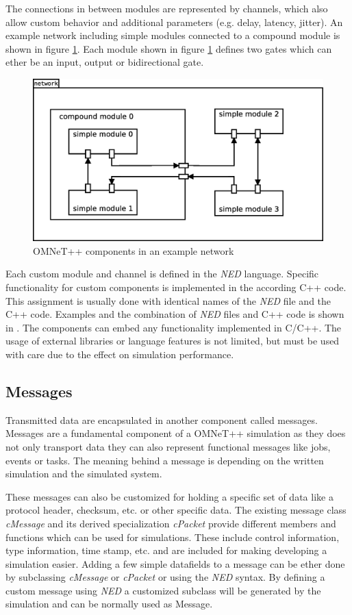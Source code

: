 \documentclass[journal]{IEEEtran}
\begin{document}
The connections in between modules are represented by channels, which also allow custom behavior and additional parameters (e.g. delay, latency, jitter).
An example network including simple modules connected to a compound module is shown in figure \ref{fig:OMNeTComponents}.
Each module shown in figure \ref{fig:OMNeTComponents} defines two gates which can ether be an input, output or bidirectional gate.

\begin{figure}
    \centering
    \includegraphics[width=0.9\columnwidth]{OMNeTComponents.eps}
    \caption{OMNeT++ components in an example network}
    \label{fig:OMNeTComponents}
\end{figure}

Each custom module and channel is defined in the \emph{NED} language.
Specific functionality for custom components is implemented in the according C++ code.
This assignment is usually done with identical names of the \emph{NED} file and the C++ code.
Examples and the combination of \emph{NED} files and C++ code is shown in \cite[chapter 3, chapter 4]{OMNETMANUAL}.
The components can embed any functionality implemented in C/C++.
The usage of external libraries or language features is not limited, but must be used with care due to the effect on simulation performance.


\subsection{Messages}
Transmitted data are encapsulated in another component called messages.
Messages are a fundamental component of a OMNeT++ simulation as they does not only transport data they can also represent functional messages like jobs, events or tasks.
The meaning behind a message is depending on the written simulation and the simulated system.

These messages can also be customized for holding a specific set of data like a protocol header, checksum, etc. or other specific data.
The existing message class \emph{cMessage} and its derived specialization \emph{cPacket} provide different members and functions which can be used for simulations.
These include control information, type information, time stamp, etc. and are included for making developing a simulation easier.
Adding a few simple datafields to a message can be ether done by subclassing \emph{cMessage} or \emph{cPacket} or using the \emph{NED} syntax.
By defining a custom message using \emph{NED} a customized subclass will be generated by the simulation and can be normally used as Message.
\end{document}
